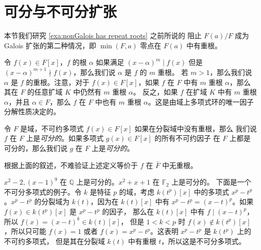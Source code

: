 \section{可分与不可分扩张}

本节我们研究 \autoref{exa:nonGalois has repeat roots} 之前所说的
阻止 $F(a)/F$ 成为 Galois 扩张的第二种情况，即
$\min(F,a)$ 零点在 $F(a)$ 中有重根。

令 $f(x)\in F[x]$，$f$ 的根 $\alpha$ 如果满足 $(x-\alpha)^m\mid f(x)$
但是 $(x-\alpha)^{m+1}\nmid f(x)$，那么我们说 $\alpha$ 是 $f$ 的 $m$ 重根。
若 $m >1$，那么我们说 $\alpha$ 是 $f$ 的重根。注意，对于 $f(x)\in F[x]$，如果
$f$ 在 $F$ 中有 $m$ 重根 $\alpha$，那么其在 $F$ 的任意扩域 $K$ 中仍然有 $m$ 重根 $\alpha$。
反之，如果 $f$ 在扩域 $K$ 中有 $m$ 重根 $\alpha$，并且 $\alpha\in F$，那么
$f$ 在 $F$ 中也有 $m$ 重根 $\alpha$。这是由域上多项式环的唯一因子分解性质决定的。

\begin{definition}
  令 $F$ 是域，不可约多项式 $f(x)\in F[x]$ 如果在分裂域中没有重根，那么
  我们说 $f$ 在 $F$ 上是\emph{可分的}。如果多项式 $g(x)\in F[x]$ 的所有不可约因子
  在 $F$ 上都是可分的，那么我们说 $g$ 在 $F$ 上是\emph{可分的}。
\end{definition}

根据上面的叙述，不难验证上述定义等价于 $f$ 在 $\bar F$ 中无重根。

\begin{example}\label{exa:separable or not polynomial}
  $x^2-2,(x-1)^9$ 在 $\mathbb{Q}$ 上是可分的。$x^2+x+1$ 在 $\mathbb{F}_2$ 上是可分的。
  下面是一个不可分多项式的例子。令 $k$ 是特征 $p$ 的域，考虑 $k(t^p)[x]$ 中的多项式
  $x^p-t^p$。$x^p-t^p$ 的分裂域为 $k(t)$，因为在 $k(t)[x]$ 中有
  $x^p-t^p=(x-t)^p$。如果 $f(x)\in k(t^p)[x]$ 是 $x^p-t^p$ 的因子，
  那么在 $k(t)[x]$ 中有 $f\mid (x-t)^p$，所以 $f(x)=(x-t)^k\in k(t)[x]$，
  但是 $1<k<p$ 时 $f(x)\notin k(t^p)[x]$，所以只可能 $f(x)=1$ 或者
  $f(x)=x^p-t^p$。这表明 $x^p-t^p$ 是 $k(t^p)$ 上的不可约多项式，
  但是其在分裂域 $k(t)$ 中有重根 $t$，所以这是不可分多项式。
\end{example}

